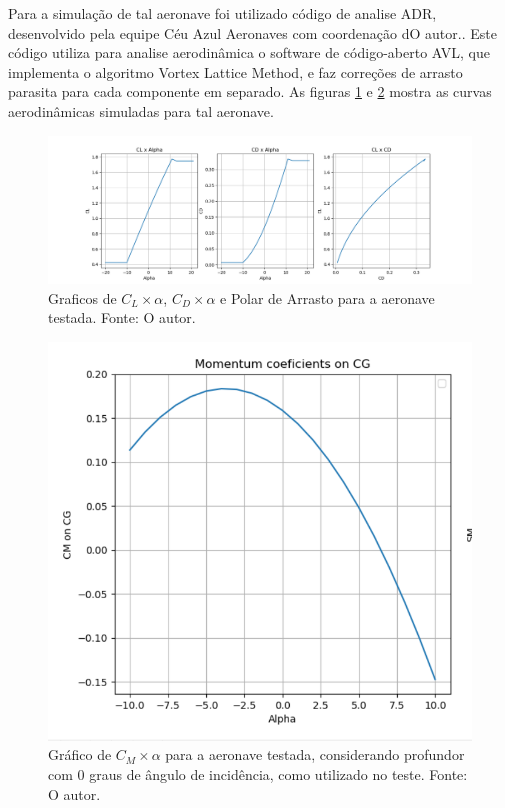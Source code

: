 Para a simulação de tal aeronave foi utilizado código de analise ADR, desenvolvido pela equipe Céu Azul Aeronaves com coordenação dO autor.. Este código utiliza para analise aerodinâmica o software de código-aberto AVL, que implementa o algoritmo Vortex Lattice Method, e faz correções de arrasto parasita para cada componente em separado. As figuras \ref{fig:adr_resultados_1} e \ref{fig:adr_resultados_2} mostra as curvas aerodinâmicas simuladas para tal aeronave.



\begin{figure}[!ht]
    \centering
    \includegraphics[width=.8\linewidth]{figuras/ADR/cl_cd_polar.png}
    \caption{Graficos de $C_L \times \alpha$, $C_D \times \alpha$ e Polar de Arrasto para a aeronave testada. Fonte: O autor.}
    \label{fig:adr_resultados_1}
\end{figure}

\begin{figure}[!ht]
    \centering
    \includegraphics[width=.8\linewidth]{figuras/ADR/cm_alpha_0.png}
    \caption{Gráfico de $C_M \times \alpha$ para a aeronave testada, considerando profundor com 0 graus de ângulo de incidência, como utilizado no teste. Fonte: O autor.}
    \label{fig:adr_resultados_2}
\end{figure}

